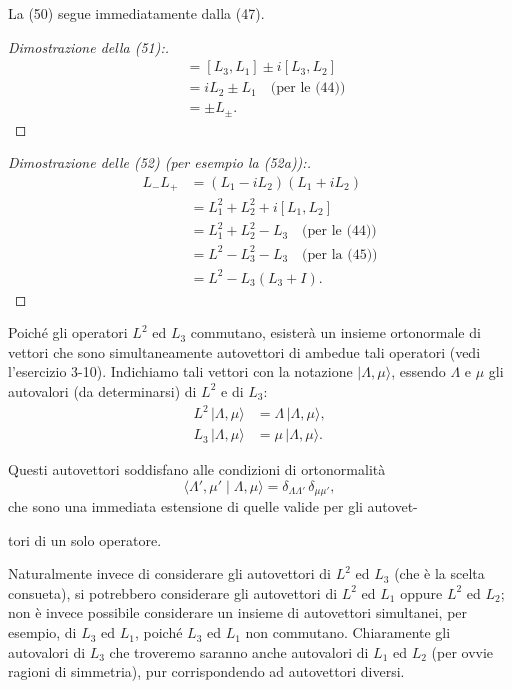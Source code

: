 \documentclass[11pt, a4paper]{book}
\numberwithin{equation}{section}
\begin{document}
La (50) segue immediatamente dalla (47).

\begin{proof}[Dimostrazione della (51):]
\begin{align*}
[L_3, L_\pm] &= [L_3, L_1] \pm i[L_3, L_2] \\
  &= iL_2 \pm L_1 \quad \text{(per le (44))} \\
  &= \pm L_\pm.
\end{align*}
\end{proof}

\begin{proof}[Dimostrazione delle (52) (per esempio la (52a)):]
\begin{align*}
L_- L_+ &= (L_1 - iL_2)(L_1 + iL_2) \\
  &= L_1^2 + L_2^2 + i[L_1, L_2] \\
  &= L_1^2 + L_2^2 - L_3 \quad \text{(per le (44))} \\
  &= L^2 - L_3^2 - L_3 \quad \text{(per la (45))} \\
  &= L^2 - L_3(L_3 + I).
\end{align*}
\end{proof}

Poiché gli operatori $L^2$ ed $L_3$ commutano, esisterà un insieme
ortonormale di vettori che sono simultaneamente autovettori di ambedue
tali operatori (vedi l'esercizio 3-10). Indichiamo tali vettori con la
notazione $|\Lambda, \mu\rangle$, essendo $\Lambda$ e $\mu$ gli autovalori
(da determinarsi) di $L^2$ e di $L_3$:
\begin{align}
L^2\,|\Lambda,\mu\rangle &= \Lambda\,|\Lambda,\mu\rangle, \tag{53a} \\
L_3\,|\Lambda,\mu\rangle &= \mu\,|\Lambda,\mu\rangle. \tag{53b}
\end{align}

Questi autovettori soddisfano alle condizioni di ortonormalità
\begin{equation}
\langle \Lambda',\mu' \mid \Lambda,\mu \rangle
= \delta_{\Lambda\Lambda'}\,\delta_{\mu\mu'},
\end{equation}
che sono una immediata estensione di quelle valide per gli autovet-


tori di un solo operatore.

Naturalmente invece di considerare gli autovettori di $L^2$ ed $L_3$
(che è la scelta consueta), si potrebbero considerare gli autovettori di
$L^2$ ed $L_1$ oppure $L^2$ ed $L_2$; non è invece possibile considerare
un insieme di autovettori simultanei, per esempio, di $L_3$ ed $L_1$,
poiché $L_3$ ed $L_1$ non commutano. Chiaramente gli autovalori di $L_3$
che troveremo saranno anche autovalori di $L_1$ ed $L_2$ (per ovvie
ragioni di simmetria), pur corrispondendo ad autovettori diversi.
\end{document}

